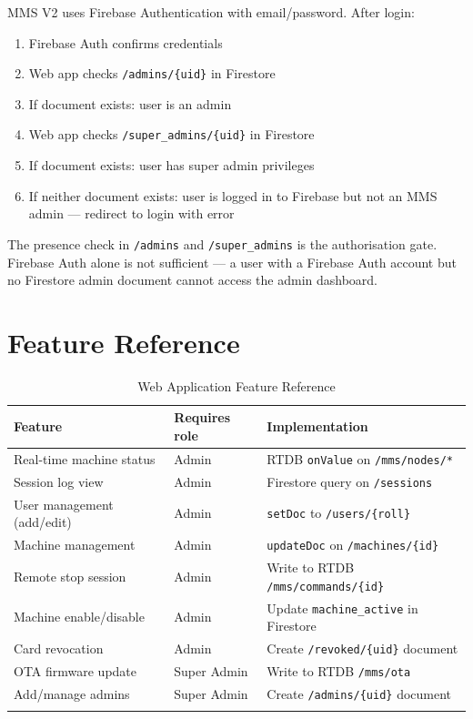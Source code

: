MMS V2 uses Firebase Authentication with email/password. After login:

\begin{enumerate}[leftmargin=1.5em]
    \item Firebase Auth confirms credentials
    \item Web app checks \texttt{/admins/\{uid\}} in Firestore
    \item If document exists: user is an admin
    \item Web app checks \texttt{/super\_admins/\{uid\}} in Firestore
    \item If document exists: user has super admin privileges
    \item If neither document exists: user is logged in to Firebase but not an MMS admin --- redirect to login with error
\end{enumerate}

\begin{notebox}
The presence check in \texttt{/admins} and \texttt{/super\_admins} is the authorisation gate. Firebase Auth alone is not sufficient --- a user with a Firebase Auth account but no Firestore admin document cannot access the admin dashboard.
\end{notebox}

\section{Feature Reference}

\begin{longtable}{L{5cm}L{4cm}L{5.5cm}}
\toprule
\textbf{Feature} & \textbf{Requires role} & \textbf{Implementation} \\
\midrule
\endhead
Real-time machine status & Admin & RTDB \texttt{onValue} on \texttt{/mms/nodes/*} \\
Session log view & Admin & Firestore query on \texttt{/sessions} \\
User management (add/edit) & Admin & \texttt{setDoc} to \texttt{/users/\{roll\}} \\
Machine management & Admin & \texttt{updateDoc} on \texttt{/machines/\{id\}} \\
Remote stop session & Admin & Write to RTDB \texttt{/mms/commands/\{id\}} \\
Machine enable/disable & Admin & Update \texttt{machine\_active} in Firestore \\
Card revocation & Admin & Create \texttt{/revoked/\{uid\}} document \\
OTA firmware update & Super Admin & Write to RTDB \texttt{/mms/ota} \\
Add/manage admins & Super Admin & Create \texttt{/admins/\{uid\}} document \\
\bottomrule
\caption{Web Application Feature Reference}
\end{longtable}

